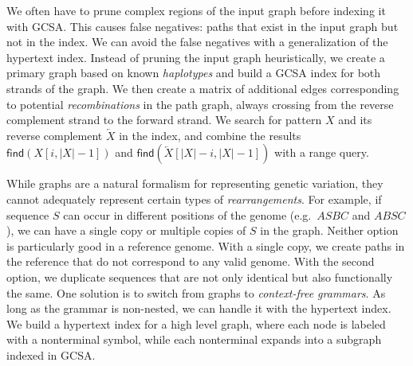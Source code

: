 \documentclass[a4paper,11pt]{llncs}
\newcommand{\abs}[1]{\ensuremath{\lvert #1 \rvert}}
\newcommand{\revcomp}[1]{\ensuremath{\overleftarrow{#1}}}
\newcommand{\find}{\ensuremath{\mathsf{find}}}
\begin{document}
We often have to prune complex regions of the input graph before indexing it with GCSA. This causes false negatives: paths that exist in the input graph but not in the index. We can avoid the false negatives with a generalization of the hypertext index. Instead of pruning the input graph heuristically, we create a primary graph based on known \emph{haplotypes} and build a GCSA index for both strands of the graph. We then create a matrix of additional edges corresponding to potential \emph{recombinations} in the path graph, always crossing from the reverse complement strand to the forward strand. We search for pattern $X$ and its reverse complement $\revcomp{X}$ in the index, and combine the results $\find(X[i, \abs{X}-1])$ and $\find(\revcomp{X}[\abs{X}-i, \abs{X}-1])$ with a range query.

While graphs are a natural formalism for representing genetic variation, they cannot adequately represent certain types of \emph{rearrangements}. For example, if sequence $S$ can occur in different positions of the genome (e.g.~$ASBC$ and $ABSC$), we can have a single copy or multiple copies of $S$ in the graph. Neither option is particularly good in a reference genome. With a single copy, we create paths in the reference that do not correspond to any valid genome. With the second option, we duplicate sequences that are not only identical but also functionally the same. One solution is to switch from graphs to \emph{context-free grammars}. As long as the grammar is non-nested, we can handle it with the hypertext index. We build a hypertext index for a high level graph, where each node is labeled with a nonterminal symbol, while each nonterminal expands into a subgraph indexed in GCSA.
\end{document}
